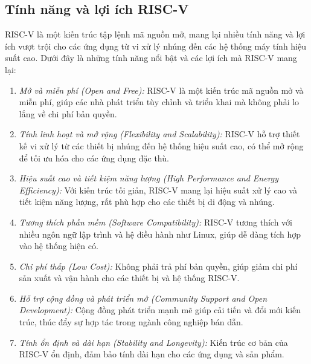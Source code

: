 \subsection{Tính năng và lợi ích RISC-V}
RISC-V là một kiến trúc tập lệnh mã nguồn mở, mang lại nhiều tính năng và lợi ích vượt trội cho các ứng dụng từ vi xử lý nhúng đến các hệ thống máy tính hiệu suất cao. Dưới đây là những tính năng nổi bật và các lợi ích mà RISC-V mang lại:
\begin{enumerate}
    \item \textit{Mở và miễn phí (Open and Free):} RISC-V là một kiến trúc mã nguồn mở và miễn phí, giúp các nhà phát triển tùy chỉnh và triển khai mà không phải lo lắng về chi phí bản quyền.
    \item \textit{Tính linh hoạt và mở rộng (Flexibility and Scalability):} RISC-V hỗ trợ thiết kế vi xử lý từ các thiết bị nhúng đến hệ thống hiệu suất cao, có thể mở rộng để tối ưu hóa cho các ứng dụng đặc thù.
    \item \textit{Hiệu suất cao và tiết kiệm năng lượng (High Performance and Energy Efficiency):}
Với kiến trúc tối giản, RISC-V mang lại hiệu suất xử lý cao và tiết kiệm năng lượng, rất phù hợp cho các thiết bị di động và nhúng.
    \item \textit{Tương thích phần mềm (Software Compatibility):}
RISC-V tương thích với nhiều ngôn ngữ lập trình và hệ điều hành như Linux, giúp dễ dàng tích hợp vào hệ thống hiện có.
    \item \textit{Chi phí thấp (Low Cost):}
Không phải trả phí bản quyền, giúp giảm chi phí sản xuất và vận hành cho các thiết bị và hệ thống RISC-V.
    \item \textit{Hỗ trợ cộng đồng và phát triển mở (Community Support and Open Development):}
Cộng đồng phát triển mạnh mẽ giúp cải tiến và đổi mới kiến trúc, thúc đẩy sự hợp tác trong ngành công nghiệp bán dẫn.
    \item \textit{Tính ổn định và dài hạn (Stability and Longevity):}
Kiến trúc cơ bản của RISC-V ổn định, đảm bảo tính dài hạn cho các ứng dụng và sản phẩm.
\end{enumerate}












